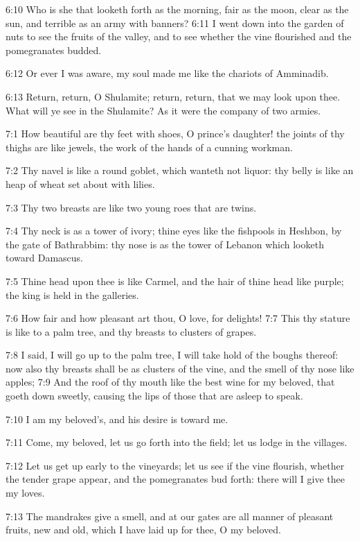 6:10 Who is she that looketh forth as the morning, fair as the moon, clear as the sun, and terrible as an army with banners?  6:11 I went down into the garden of nuts to see the fruits of the valley, and to see whether the vine flourished and the pomegranates budded.

6:12 Or ever I was aware, my soul made me like the chariots of Amminadib.

6:13 Return, return, O Shulamite; return, return, that we may look upon thee. What will ye see in the Shulamite? As it were the company of two armies.

7:1 How beautiful are thy feet with shoes, O prince's daughter! the joints of thy thighs are like jewels, the work of the hands of a cunning workman.

7:2 Thy navel is like a round goblet, which wanteth not liquor: thy belly is like an heap of wheat set about with lilies.

7:3 Thy two breasts are like two young roes that are twins.

7:4 Thy neck is as a tower of ivory; thine eyes like the fishpools in Heshbon, by the gate of Bathrabbim: thy nose is as the tower of Lebanon which looketh toward Damascus.

7:5 Thine head upon thee is like Carmel, and the hair of thine head like purple; the king is held in the galleries.

7:6 How fair and how pleasant art thou, O love, for delights!  7:7 This thy stature is like to a palm tree, and thy breasts to clusters of grapes.

7:8 I said, I will go up to the palm tree, I will take hold of the boughs thereof: now also thy breasts shall be as clusters of the vine, and the smell of thy nose like apples; 7:9 And the roof of thy mouth like the best wine for my beloved, that goeth down sweetly, causing the lips of those that are asleep to speak.

7:10 I am my beloved's, and his desire is toward me.

7:11 Come, my beloved, let us go forth into the field; let us lodge in the villages.

7:12 Let us get up early to the vineyards; let us see if the vine flourish, whether the tender grape appear, and the pomegranates bud forth: there will I give thee my loves.

7:13 The mandrakes give a smell, and at our gates are all manner of pleasant fruits, new and old, which I have laid up for thee, O my beloved.

